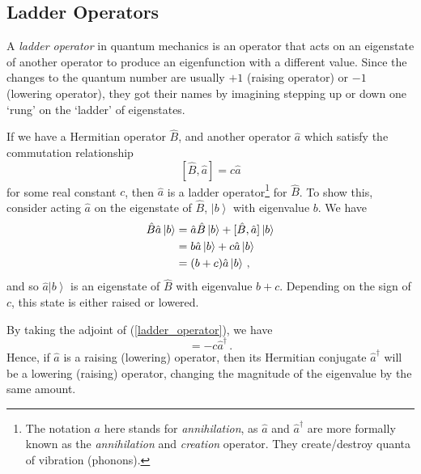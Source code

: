 \documentclass{article}
\theoremstyle{plain}\theoremheaderfont{\normalfont\itshape}\theorembodyfont{\rmfamily}\theoremseparator{.}\newtheorem*{rem}{Remark}\newtheorem*{ex}{Example}\newtheorem*{proof}{Proof}\newtheorem*{altp}{Alternative proof}
\theoremstyle{plain}\theoremheaderfont{\normalfont\bfseries}\theorembodyfont{\rmfamily}\theoremseparator{.}\newtheorem{thm}{Theorem}[section]\newtheorem{lem}[thm]{Lemma}\newtheorem{prop}[thm]{Proposition}\newtheorem*{cor}{Corollary}\newtheorem{defn}[thm]{Definition}\newtheorem{clm}[thm]{Claim}\newtheorem{clminproof}{Claim}
\theoremstyle{break}\theoremheaderfont{\normalfont\itshape}\theorembodyfont{\rmfamily}\theoremseparator{.\medskip}\newtheorem*{proofskip}{Proof}\newtheorem*{exs}{Examples}\newtheorem*{rems}{Remarks}
\theoremstyle{break}\theoremheaderfont{\normalfont\bfseries}\theorembodyfont{\rmfamily}\theoremseparator{.\medskip}\newtheorem{lemskip}[thm]{Lemma}\newtheorem{defnskip}[thm]{Definition}\newtheorem{propskip}[thm]{Proposition}\newtheorem{thmskip}[thm]{Theorem}
\numberwithin{equation}{section}
\newcommand{\ket}[1]{\left| #1 \right\rangle}
\begin{document}
    \subsection{Ladder Operators}
    A \textit{ladder operator} in quantum mechanics is an operator that acts on an eigenstate of another operator to produce an eigenfunction with a different value. Since the changes to the quantum number are usually \(+1\) (raising operator) or \(-1\) (lowering operator), they got their names by imagining stepping up or down one `rung' on the `ladder' of eigenstates.

    If we have a Hermitian operator \(\hat{B}\), and another operator \(\hat{a}\) which satisfy the commutation relationship
    \begin{equation}\label{ladder_operator}
        [\hat{B},\hat{a}]=c\hat{a}
    \end{equation}
    for some real constant \(c\), then \(\hat{a}\) is a ladder operator\footnote{The notation \(a\) here stands for \textit{annihilation}, as \(\hat{a}\) and \(\hat{a}^\dagger\) are more formally known as the \textit{annihilation} and \textit{creation} operator. They create/destroy quanta of vibration (phonons).} for \(\hat{B}\). To show this, consider acting \(\hat{a}\) on the eigenstate of \(\hat{B}\), \(\ket{b}\) with eigenvalue \(b\). We have
    \begin{align}
        \hat{B}\hat{a}\ket{b}&=\hat{a}\hat{B}\ket{b}+[\hat{B},\hat{a}]\ket{b}\notag \\
        &=b\hat{a}\ket{b}+c\hat{a}\ket{b}\notag \\
        &=(b+c)\hat{a}\ket{b}\,,
    \end{align}
    and so \(\hat{a}\ket{b}\) is an eigenstate of \(\hat{B}\) with eigenvalue \(b+c\). Depending on the sign of \(c\), this state is either raised or lowered.

    By taking the adjoint of (\ref{ladder_operator}), we have
    \begin{equation}
        [\hat{B},\hat{a}^\dagger]=-c\hat{a}^\dagger\,.
    \end{equation}
    Hence, if \(\hat{a}\) is a raising (lowering) operator, then its Hermitian conjugate \(\hat{a}^\dagger\) will be a lowering (raising) operator, changing the magnitude of the eigenvalue by the same amount.
\end{document}

